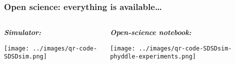 \begin{frame}
    \frametitle{Open science: everything is available\ldots}
    \begin{columns}[c]

        \begin{minipage}[c][\frametextheight][c]{\columnwidth}
            \begin{center}

            \textbf{\textit{Simulator:}}

            \texttt{[image: ../images/qr-code-SDSDsim.png]}

            \end{center}

        \end{minipage}


        \begin{minipage}[c][\frametextheight][c]{\columnwidth}
            \begin{center}

            \textbf{\textit{Open-science notebook:}}

            \texttt{[image: ../images/qr-code-SDSDsim-phyddle-experiments.png]}

            \end{center}

        \end{minipage}

    \end{columns}
\end{frame}
